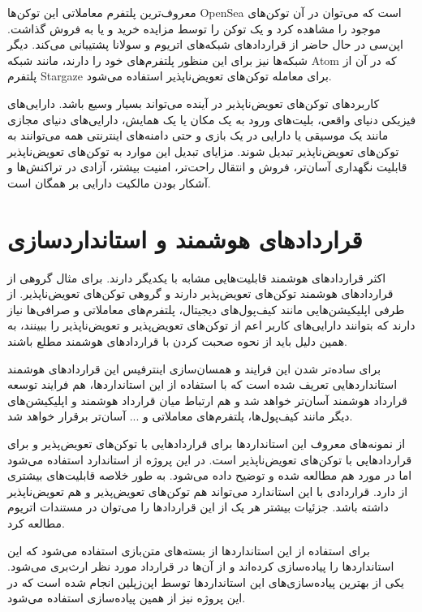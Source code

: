 معروف‌ترین پلتفرم معاملاتی این توکن‌ها
\gls{OpenSea}
است که می‌توان در آن توکن‌های موجود را مشاهده کرد و یک توکن را توسط مزایده خرید و یا به فروش گذاشت.
اپن‌سی در حال حاضر از قراردادهای شبکه‌های اتریوم و سولانا پشتیبانی می‌کند.
دیگر شبکه‌ها نیز برای این منظور پلتفرم‌های خود را دارند، مانند شبکه
\gls{Atom}
که در آن از پلتفرم
\gls{Stargaze}
برای معامله توکن‌های تعویض‌ناپذیر استفاده می‌شود.

کاربردهای توکن‌های تعویض‌ناپذیر در آینده می‌تواند بسیار وسیع باشد.
دارایی‌های فیزیکی دنیای واقعی، بلیت‌های ورود به یک مکان یا یک همایش،
دارایی‌های دنیای مجازی مانند یک موسیقی یا دارایی در یک بازی
و حتی دامنه‌های اینترنتی همه می‌توانند به توکن‌های تعویض‌ناپذیر تبدیل شوند.
مزایای تبدیل این موارد به توکن‌های تعویض‌ناپذیر قابلیت نگهداری آسان‌تر،
فروش و انتقال راحت‌تر، امنیت بیشتر، آزادی در تراکنش‌ها
و آشکار بودن مالکیت دارایی بر همگان است.


\section{قرارداد‌های هوشمند و استانداردسازی}
اکثر قرارداد‌های هوشمند قابلیت‌هایی مشابه با یکدیگر دارند.
برای مثال گروهی از قرارداد‌های هوشمند توکن‌های تعویض‌پذیر دارند
و گروهی توکن‌های تعویض‌ناپذیر.
از طرفی اپلیکیشن‌هایی مانند کیف‌پول‌های دیجیتال،
پلتفرم‌های معاملاتی و صرافی‌ها
نیاز دارند که بتوانند دارایی‌های کاربر
اعم از توکن‌های تعویض‌پذیر و تعویض‌ناپذیر را ببینند،
به همین دلیل باید از نحوه صحبت کردن با قراردادهای هوشمند مطلع باشند.

برای ساده‌تر شدن این فرایند
و همسان‌سازی اینترفیس این قراردادهای هوشمند استانداردهایی تعریف شده است
که با استفاده از این استانداردها، هم فرایند توسعه قرارداد هوشمند آسان‌تر خواهد شد
و هم ارتباط میان قرارداد هوشمند و اپلیکیشن‌های دیگر مانند کیف‌پول‌ها، پلتفرم‌های معاملاتی و ... آسان‌تر برقرار خواهد شد.

از نمونه‌های معروف این استانداردها
برای قرارداد‌هایی با توکن‌های تعویض‌پذیر و
برای قراردادهایی با توکن‌های تعویض‌ناپذیر است. در این پروژه از استاندارد
استفاده می‌شود اما در مورد
هم مطالعه شده و توضیح داده می‌شود.
به طور خلاصه
قابلیت‌های بیشتری از
دارد.
قراردادی با این استاندارد می‌تواند هم توکن‌های تعویض‌پذیر و هم تعویض‌ناپذیر داشته باشد.
جزئیات بیشتر هر یک از این قراردادها را می‌توان در مستندات اتریوم
\cite{EthereumDocs}
مطالعه کرد.

برای استفاده از این استاندارد‌ها از بسته‌های متن‌بازی استفاده می‌شود که این استاندارد‌ها را پیاده‌سازی کرده‌اند
و از آن‌ها در قرارداد مورد نظر ارث‌بری می‌شود.
یکی از بهترین پیاده‌سازی‌های این استاندارد‌ها توسط اپن‌زپلین
\cite{ZeppelinDocs}
انجام شده است که در این پروژه نیز از همین پیاده‌سازی استفاده می‌شود.

